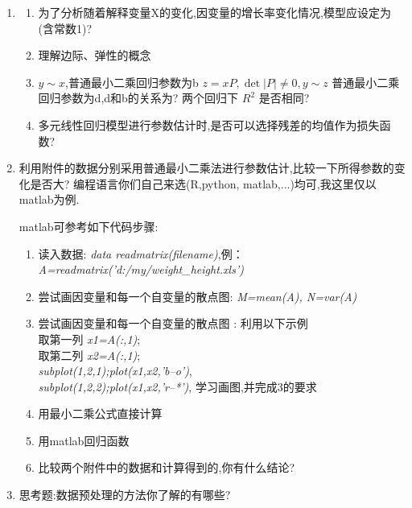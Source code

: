 \begin{enumerate}
\item
\begin{enumerate}

    \item 为了分析随着解释变量X的变化,因变量的增长率变化情况,模型应设定为(含常数1)? 
    \item 理解边际、弹性的概念 
    \item $y\sim x$,普通最小二乘回归参数为b $z=xP, \det|P|\ne0, y\sim z$ 普通最小二乘回归参数为d,d和b的关系为? 两个回归下 $R^{2}$ 是否相同? 
    \item 多元线性回归模型进行参数估计时,是否可以选择残差的均值作为损失函数? 
\end{enumerate}

\item 利用附件的数据分别采用普通最小二乘法进行参数估计,比较一下所得参数的变化是否大? 编程语言你们自己来选(R,python, matlab,...)均可,我这里仅以matlab为例.

matlab可参考如下代码步骤: 
\begin{enumerate}

    \item 读入数据: \textit{data readmatrix(filename)},例：\textit{A=readmatrix('d:{/}my{/}weight_height.xls')}
    \item 尝试画因变量和每一个自变量的散点图: \textit{M=mean(A), N=var(A)}
    \item 尝试画因变量和每一个自变量的散点图 :
    利用以下示例\\
取第一列 \textit{x1=A(:,1)};\\
取第二列 \textit{x2=A(:,1)};\\
\textit{subplot(1,2,1);plot(x1,x2,'b--o')},\\
\textit{subplot(1,2,2);plot(x1,x2,'r--*')}, 学习画图,并完成3的要求\\
 
    
    \item 用最小二乘公式直接计算 
    \item 用matlab回归函数 
    \item 比较两个附件中的数据和计算得到的,你有什么结论? 
\end{enumerate}

\item 思考题:数据预处理的方法你了解的有哪些? 

\end{enumerate}

